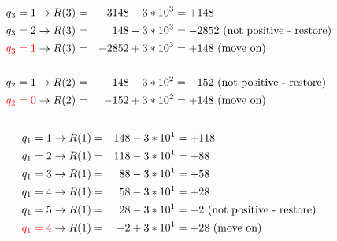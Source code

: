 \documentclass{article}
\begin{document}
\begin{align*}
    q_3 = 1                  & \rightarrow R(3) = & 3148 - 3 * 10^3  & = +148                                   \\
    q_3 = 2                  & \rightarrow R(3) = & 148 - 3 * 10^3   & = -2852 \text{ (not positive - restore)} \\
    \textcolor{red}{q_3 = 1} & \rightarrow R(3) = & -2852 + 3 * 10^3 & = +148 \text{ (move on)}                 \\
    \\
    q_2 = 1                  & \rightarrow R(2) = & 148 - 3 * 10^2   & = -152 \text{ (not positive - restore)}  \\
    \textcolor{red}{q_2 = 0} & \rightarrow R(2) = & -152 + 3 * 10^2  & = +148 \text{ (move on)}                 \\
    \\
\end{align*}
\begin{align*}
    q_1 = 1                  & \rightarrow R(1) = & 148 - 3 * 10^1 & = +118                                \\
    q_1 = 2                  & \rightarrow R(1) = & 118 - 3 * 10^1 & = +88                                 \\
    q_1 = 3                  & \rightarrow R(1) = & 88 - 3 * 10^1  & = +58                                 \\
    q_1 = 4                  & \rightarrow R(1) = & 58 - 3 * 10^1  & = +28                                 \\
    q_1 = 5                  & \rightarrow R(1) = & 28 - 3 * 10^1  & = -2 \text{ (not positive - restore)} \\
    \textcolor{red}{q_1 = 4} & \rightarrow R(1) = & -2 + 3 * 10^1  & = +28 \text{ (move on)}               \\
\end{align*}
\end{document}

